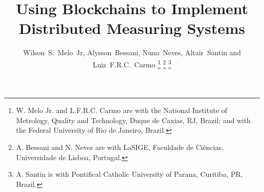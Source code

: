 \documentclass[journal]{IEEEtran}
\begin{document}

\title{Using Blockchains to Implement Distributed Measuring Systems}

\author{
\and
{}
\and
{}
}

\author{Wilson~S.~Melo~Jr, %
        Alysson~Bessani, %
        Nuno~Neves, %
        Altair~Santin
        and Luiz~F.R.C.~Carmo
\thanks{W. Melo Jr. and L.F.R.C. Carmo are with the National Institute of Metrology, Quality and Technology, Duque de Caxias, RJ, Brazil; and with the Federal University of Rio de Janeiro, Brazil.}%
\thanks{A. Bessani and N. Neves are with LaSIGE, Faculdade de Ci\^encias, Universidade de Lisboa, Portugal.}%
\thanks{A. Santin is with Pontifical Catholic University of Parana, Curitiba, PR, Brazil.}%
}
\end{document}
